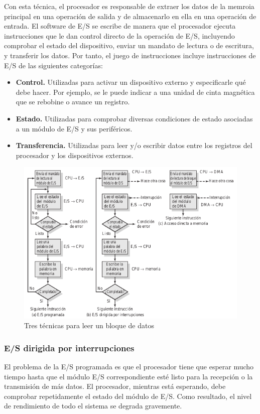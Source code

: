 \documentclass{article}
\begin{document}
							Con esta técnica, el procesador es responsable de extraer los datos de la memroia principal en una operación de salida y de almacenarlo en ella en una operación de entrada. El software de E/S se escribe de manera que el procesador ejecuta instrucciones que le dan control directo de la operación de E/S, incluyendo comprobar el estado del dispositivo, enviar un mandato de lectura o de escritura, y transferir los datos. Por tanto, el juego de instrucciones incluye instrucciones de E/S de las siguientes categorías:
							
							\begin{itemize}
							\item \textbf{Control.} Utilizadas para activar un dispositivo externo y especificarle qué debe hacer. Por ejemplo, se le puede indicar a una unidad de cinta magnética que se rebobine o avance un registro.
							\item \textbf{Estado.} Utilizadas para comprobar diversas condiciones de estado asociadas a un módulo de E/S y sus periféricos.
							\item \textbf{Transferencia.} Utilizadas para leer y/o escribir datos entre los registros del procesador y los dispositivos externos.
							\end{itemize}
							
							\begin{figure}
							\caption{Tres técnicas para leer un bloque de datos}
							\label{figura11:tecnicasE/S}
							\centering
							\includegraphics[width=1\textwidth, scale=1]{figura11.png}
							\end{figure}
							
						\subsubsection{E/S dirigida por interrupciones}
							El problema de la E/S programada es que el procesador tiene que esperar mucho tiempo hasta que el módulo E/S correspondiente esté listo para la recepción o la transmisión de más datos. El procesador, mientras está esperando, debe comprobar repetidamente el estado del módulo de E/S. Como resultado, el nivel de rendimiento de todo el sistema se degrada gravemente. \\
							
\end{document}
